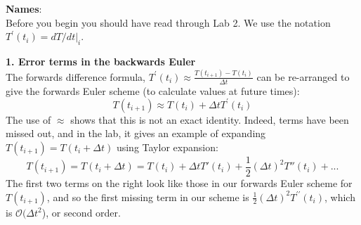 \documentclass[12pt]{article}
\begin{document}
{\bf Names}:\\


Before you begin you should have read through Lab 2. We use the notation $T^\prime(t_i) = dT/dt|_i$.


\textbf{1. Error terms in the backwards Euler} \\
The forwards difference formula, $T^\prime(t_i) \approx \frac{T(t_{i+1})-T(t_i)}{\Delta t}$  can be re-arranged to give the forwards Euler scheme (to calculate values at future times): $$T(t_{i+1}) \approx T(t_{i}) + \Delta t T^\prime(t_i)$$ The use of $\approx$ shows that this is not an exact identity. Indeed, terms have been missed out, and in the lab, it gives an example of expanding $T(t_{i+1}) = T(t_i + \Delta t)$ using Taylor expansion:
$$T(t_{i+1}) = T(t_i + \Delta t) = T(t_i) + \Delta t T'(t_i) + \frac{1}{2} (\Delta t)^2 T''(t_i) + ...$$
The first two terms on the right look like those in our forwards Euler scheme for $T(t_{i+1})$, and so the first missing term in our scheme is $\frac{1}{2}(\Delta t)^2 T^{\prime\prime}(t_i)$, which is $\mathcal{O}(\Delta t^2$), or second order. 
\end{document}
